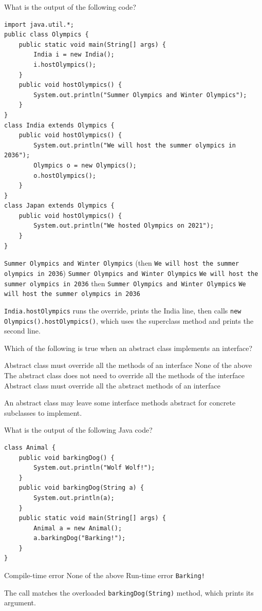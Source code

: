 \question[4]
What is the output of the following code?
\begin{lstlisting}[style=java]
import java.util.*;
public class Olympics {
    public static void main(String[] args) {
        India i = new India();
        i.hostOlympics();
    }
    public void hostOlympics() {
        System.out.println("Summer Olympics and Winter Olympics");
    }
}
class India extends Olympics {
    public void hostOlympics() {
        System.out.println("We will host the summer olympics in 2036");
        Olympics o = new Olympics();
        o.hostOlympics();
    }
}
class Japan extends Olympics {
    public void hostOlympics() {
        System.out.println("We hosted Olympics on 2021");
    }
}
\end{lstlisting}
\begin{choices}
  \choice \texttt{Summer Olympics and Winter Olympics} (then \texttt{We will host the summer olympics in 2036})
  \choice \texttt{Summer Olympics and Winter Olympics}
  \CorrectChoice \texttt{We will host the summer olympics in 2036} then \texttt{Summer Olympics and Winter Olympics}
  \choice \texttt{We will host the summer olympics in 2036}
\end{choices}
\begin{solution}
  \texttt{India.hostOlympics} runs the override, prints the India line, then calls \texttt{new Olympics().hostOlympics()}, which uses the superclass method and prints the second line.
\end{solution}

\question[4]
Which of the following is true when an abstract class implements an interface?
\begin{choices}
  \choice Abstract class must override all the methods of an interface
  \choice None of the above
  \CorrectChoice The abstract class does not need to override all the methods of the interface
  \choice Abstract class must override all the abstract methods of an interface
\end{choices}
\begin{solution}
  An abstract class may leave some interface methods abstract for concrete subclasses to implement.
\end{solution}

\question[4]
What is the output of the following Java code?
\begin{lstlisting}[style=java]
class Animal {
    public void barkingDog() {
        System.out.println("Wolf Wolf!");
    }
    public void barkingDog(String a) {
        System.out.println(a);
    }
    public static void main(String[] args) {
        Animal a = new Animal();
        a.barkingDog("Barking!");
    }
}
\end{lstlisting}
\begin{choices}
  \choice Compile-time error
  \choice None of the above
  \choice Run-time error
  \CorrectChoice \texttt{Barking!}
\end{choices}
\begin{solution}
  The call matches the overloaded \texttt{barkingDog(String)} method, which prints its argument.
\end{solution}

